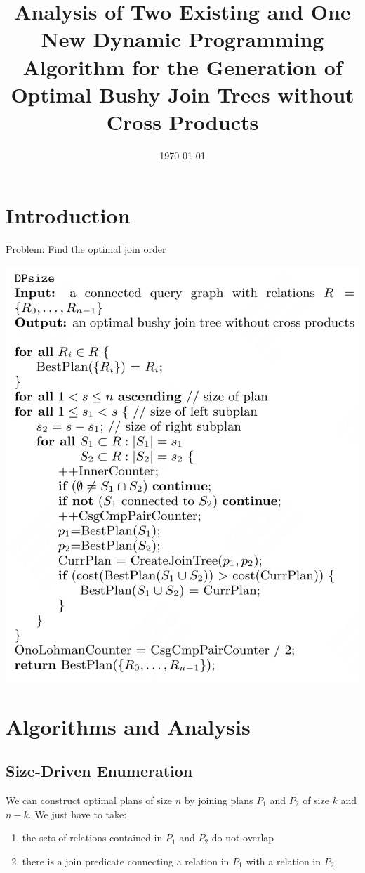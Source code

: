 \documentclass[11pt]{article}
\date{\today}
\title{Analysis of Two Existing and One New Dynamic Programming Algorithm for the Generation of Optimal Bushy Join Trees without Cross Products}
\begin{document}
\maketitle
\section{Introduction}
\label{sec:org4a98df8}
Problem: Find the optimal join order
\begin{center}
\includegraphics[width=.8\textwidth]{../../images/papers/98.png}
\end{center}
\section{Algorithms and Analysis}
\label{sec:orgf471c8c}
\subsection{Size-Driven Enumeration}
\label{sec:org99448b4}
We can construct optimal plans of size \(n\) by joining plans \(P_1\) and \(P_2\) of size \(k\) and
\(n-k\). We just have to take:
\begin{enumerate}
\item the sets of relations contained in \(P_1\) and \(P_2\) do not overlap
\item there is a join predicate connecting a relation in \(P_1\) with a relation in \(P_2\)
\end{enumerate}
\end{document}
